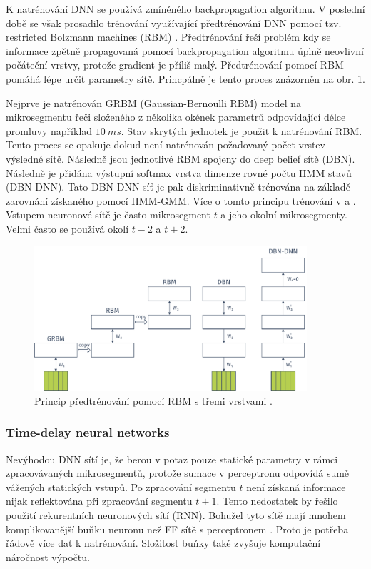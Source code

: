 K natrénování DNN se používá zmíněného backpropagation algoritmu. V poslední době se však prosadilo trénování využívající předtrénování DNN pomocí tzv. restricted Bolzmann machines (RBM) \cite{Hinton2012}. Předtrénování řeší problém kdy se informace zpětně propagovaná pomocí backpropagation algoritmu úplně neovlivní počáteční vrstvy, protože gradient je příliš malý. Předtrénování pomocí RBM pomáhá lépe určit parametry sítě. Princpálně je tento proces znázorněn na obr. \ref{fig:asr:acoustic:dnn:pretraining}.

Nejprve je natrénován GRBM (Gaussian-Bernoulli RBM) model na mikrosegmentu řeči složeného z několika okének parametrů odpovídající délce promluvy například $10\ ms$. Stav skrytých jednotek je použit k natrénování RBM. Tento proces se opakuje dokud není natrénován požadovaný počet vrstev výsledné sítě. Následně jsou jednotlivé RBM spojeny do deep belief sítě (DBN). Následně je přidána výstupní softmax vrstva dimenze rovné počtu HMM stavů (DBN-DNN). Tato DBN-DNN síť je pak diskriminativně trénována na základě zarovnání získaného pomocí HMM-GMM. Více o tomto principu trénování v \cite{Hinton2012} a \cite{Vesely2013}. Vstupem neuronové sítě je často mikrosegment $t$ a jeho okolní mikrosegmenty. Velmi často se používá okolí $t-2$ a $t+2$.

\begin{figure}[hbpt]
  \centering
  \includegraphics[width=0.9\textwidth]{./ch4-asr/img/pretraining.pdf}
  \caption{Princip předtrénování pomocí RBM s třemi vrstvami \cite{Hinton2012}.}
  \label{fig:asr:acoustic:dnn:pretraining}
\end{figure}

\subsubsection{Time-delay neural networks}

Nevýhodou DNN sítí je, že berou v potaz pouze statické parametry v rámci zpracovávaných mikrosegmentů, protože sumace v perceptronu odpovídá sumě vážených statických vstupů. Po zpracování segmentu $t$ není získaná informace nijak reflektována při zpracování segmentu $t+1$. Tento nedostatek by řešilo použití rekurentních neuronových sítí (RNN). Bohužel tyto sítě mají mnohem komplikovanější buňku neuronu než FF sítě s perceptronem \cite{Amodei2016}. Proto je potřeba řádově více dat k natrénování. Složitost buňky také zvyšuje komputační náročnost výpočtu.

